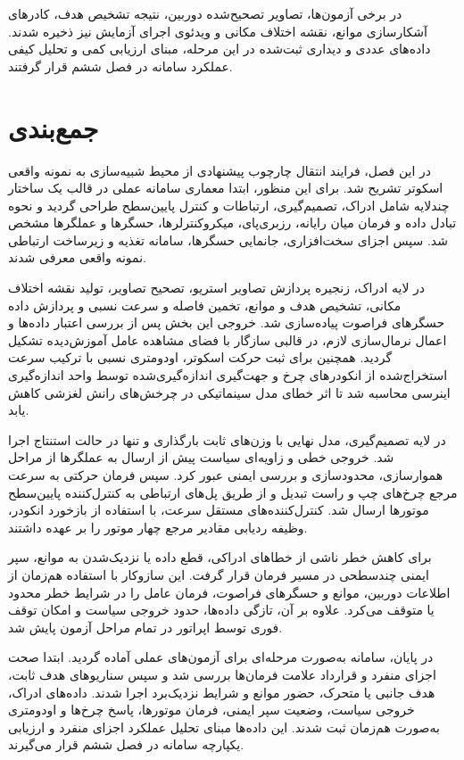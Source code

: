 در برخی آزمون‌ها، تصاویر تصحیح‌شده دوربین، نتیجه تشخیص هدف، کادرهای آشکارسازی موانع، نقشه اختلاف مکانی و ویدئوی اجرای آزمایش نیز ذخیره شدند. داده‌های عددی و دیداری ثبت‌شده در این مرحله، مبنای ارزیابی کمی و تحلیل کیفی عملکرد سامانه در فصل ششم قرار گرفتند.
\section{جمع‌بندی}
\label{sec:chapter5_summary}

در این فصل، فرایند انتقال چارچوب پیشنهادی از محیط شبیه‌سازی به نمونه واقعی اسکوتر تشریح شد. برای این منظور، ابتدا معماری سامانه عملی در قالب یک ساختار چندلایه شامل ادراک، تصمیم‌گیری، ارتباطات و کنترل پایین‌سطح طراحی گردید و نحوه تبادل داده و فرمان میان رایانه، رزبری‌پای، میکروکنترلرها، حسگرها و عملگرها مشخص شد. سپس اجزای سخت‌افزاری، جانمایی حسگرها، سامانه تغذیه و زیرساخت ارتباطی نمونه واقعی معرفی شدند.

در لایه ادراک، زنجیره پردازش تصاویر استریو، تصحیح تصاویر، تولید نقشه اختلاف مکانی، تشخیص هدف و موانع، تخمین فاصله و سرعت نسبی و پردازش داده حسگرهای فراصوت پیاده‌سازی شد. خروجی این بخش پس از بررسی اعتبار داده‌ها و اعمال نرمال‌سازی لازم، در قالبی سازگار با فضای مشاهده عامل آموزش‌دیده تشکیل گردید. همچنین برای ثبت حرکت اسکوتر، اودومتری نسبی با ترکیب سرعت استخراج‌شده از انکودرهای چرخ و جهت‌گیری اندازه‌گیری‌شده توسط واحد اندازه‌گیری اینرسی محاسبه شد تا اثر خطای مدل سینماتیکی در چرخش‌های رانش لغزشی کاهش یابد.

در لایه تصمیم‌گیری، مدل نهایی  با وزن‌های ثابت بارگذاری و تنها در حالت استنتاج اجرا شد. خروجی خطی و زاویه‌ای سیاست پیش از ارسال به عملگرها از مراحل هموارسازی، محدودسازی و بررسی ایمنی عبور کرد. سپس فرمان حرکتی به سرعت مرجع چرخ‌های چپ و راست تبدیل و از طریق پل‌های ارتباطی به کنترل‌کننده پایین‌سطح موتورها ارسال شد. کنترل‌کننده‌های مستقل سرعت، با استفاده از بازخورد انکودر، وظیفه ردیابی مقادیر مرجع چهار موتور را بر عهده داشتند.

برای کاهش خطر ناشی از خطاهای ادراکی، قطع داده یا نزدیک‌شدن به موانع، سپر ایمنی چندسطحی در مسیر فرمان قرار گرفت. این سازوکار با استفاده هم‌زمان از اطلاعات دوربین، موانع و حسگرهای فراصوت، فرمان عامل را در شرایط خطر محدود یا متوقف می‌کرد. علاوه بر آن، تازگی داده‌ها، حدود خروجی سیاست و امکان توقف فوری توسط اپراتور در تمام مراحل آزمون پایش شد.

در پایان، سامانه به‌صورت مرحله‌ای برای آزمون‌های عملی آماده گردید. ابتدا صحت اجزای منفرد و قرارداد علامت فرمان‌ها بررسی شد و سپس سناریوهای هدف ثابت، هدف جانبی یا متحرک، حضور موانع و شرایط نزدیک‌برد اجرا شدند. داده‌های ادراک، خروجی سیاست، وضعیت سپر ایمنی، فرمان موتورها، پاسخ چرخ‌ها و اودومتری به‌صورت هم‌زمان ثبت شدند. این داده‌ها مبنای تحلیل عملکرد اجزای منفرد و ارزیابی یکپارچه سامانه در فصل ششم قرار می‌گیرند.
